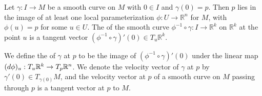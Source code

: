 \documentclass[notoc,notitlepage]{tufte-book}
\begin{document}
\begin{defn}\label{defn:velocity_vectors_on_a_submanifold}
  Let $\gamma : I \to M$ be a smooth curve on $M$ with $0 \in I$ and $\gamma(0)
  = p$. Then $p$ lies in the image of at least one local parameterization $\phi :
  U \to \mathbb{R}^n$ for $M$, with $\phi(u) = p$ for some $u \in U$. The
   of the smooth curve $\phi^{-1} \circ \gamma : I \to
  \mathbb{R}^k$ on $\mathbb{R}^k$ at the point $u$ is a tangent vector
  $(\phi^{-1} \circ \gamma)'(0) \in T_{u} \mathbb{R}^k$.
  
  We define the  of $\gamma$ at $p$ to be the image of
  $(\phi^{-1} \circ \gamma)'(0)$ under the linear map $(\mathop{}\!d{\phi})_u : T_{u}
  \mathbb{R}^k \to T_{p} \mathbb{R}^n$. We denote the velocity vector of
  $\gamma$ at $p$ by $\gamma'(0) \in T_{\gamma(0)} M$, and the velocity vector
  at $p$ of a smooth curve on $M$ passing through $p$ is a tangent vector at $p$
  to $M$.
\end{defn}
\end{document}
